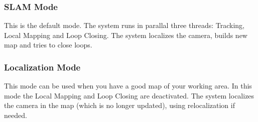 \subsubsection*{S\-L\-A\-M Mode}

This is the default mode. The system runs in parallal three threads\-: Tracking, Local Mapping and Loop Closing. The system localizes the camera, builds new map and tries to close loops.

\subsubsection*{Localization Mode}

This mode can be used when you have a good map of your working area. In this mode the Local Mapping and Loop Closing are deactivated. The system localizes the camera in the map (which is no longer updated), using relocalization if needed. 